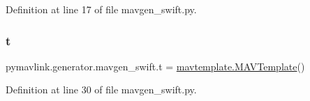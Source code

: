 Definition at line 17 of file mavgen\+\_\+swift.\+py.

\mbox{\label{namespacepymavlink_1_1generator_1_1mavgen__swift_aac7fb2c7851d03726e4b15fd2304711d}} 
\subsubsection{\texorpdfstring{t}{t}}
{\footnotesize\ttfamily pymavlink.\+generator.\+mavgen\+\_\+swift.\+t = \mbox{\hyperlink{classpymavlink_1_1generator_1_1mavtemplate_1_1MAVTemplate}{mavtemplate.\+M\+A\+V\+Template}}()}



Definition at line 30 of file mavgen\+\_\+swift.\+py.

